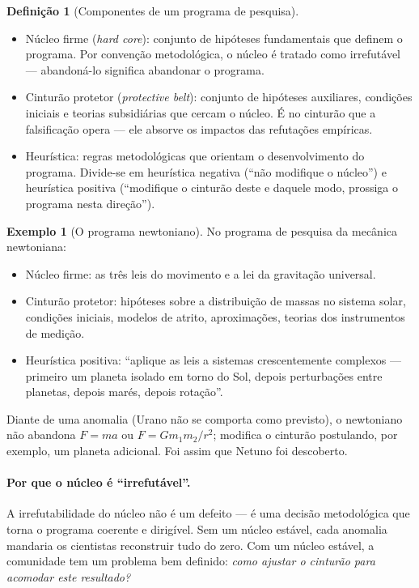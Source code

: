 \documentclass[9pt,a4paper]{extarticle}
\newcommand{\impt}[1]{\textcolor{important}{#1}}
\newcommand{\ntc}[1]{\textcolor{notice}{#1}}
\theoremstyle{definition}
\newtheorem{definition}{Definição}[section]
\newtheorem{example}{Exemplo}[section]
\begin{document}
\begin{definition}[Componentes de um programa de pesquisa]
\begin{itemize}
  \item \impt{Núcleo firme} (\emph{hard core}): conjunto de hipóteses fundamentais que definem o programa. \ntc{Por convenção metodológica, o núcleo é tratado como irrefutável} --- abandoná-lo significa abandonar o programa.
  \item \impt{Cinturão protetor} (\emph{protective belt}): conjunto de hipóteses auxiliares, condições iniciais e teorias subsidiárias que cercam o núcleo. É no cinturão que a falsificação opera --- ele absorve os impactos das refutações empíricas.
  \item \impt{Heurística}: regras metodológicas que orientam o desenvolvimento do programa. Divide-se em \impt{heurística negativa} (``não modifique o núcleo'') e \impt{heurística positiva} (``modifique o cinturão deste e daquele modo, prossiga o programa nesta direção'').
\end{itemize}
\end{definition}

\begin{example}[O programa newtoniano]
No programa de pesquisa da mecânica newtoniana:
\begin{itemize}
  \item \impt{Núcleo firme:} as três leis do movimento e a lei da gravitação universal.
  \item \impt{Cinturão protetor:} hipóteses sobre a distribuição de massas no sistema solar, condições iniciais, modelos de atrito, aproximações, teorias dos instrumentos de medição.
  \item \impt{Heurística positiva:} ``aplique as leis a sistemas crescentemente complexos --- primeiro um planeta isolado em torno do Sol, depois perturbações entre planetas, depois marés, depois rotação''.
\end{itemize}
Diante de uma anomalia (Urano não se comporta como previsto), o newtoniano não abandona $F=ma$ ou $F = G m_1 m_2 / r^2$; modifica o cinturão postulando, por exemplo, um planeta adicional. Foi assim que Netuno foi descoberto.
\end{example}

\paragraph{Por que o núcleo é ``irrefutável''.}
A irrefutabilidade do núcleo \impt{não é um defeito} --- é uma decisão metodológica que torna o programa coerente e dirigível. Sem um núcleo estável, cada anomalia mandaria os cientistas reconstruir tudo do zero. Com um núcleo estável, a comunidade tem um problema bem definido: \emph{como ajustar o cinturão para acomodar este resultado?}
\end{document}
